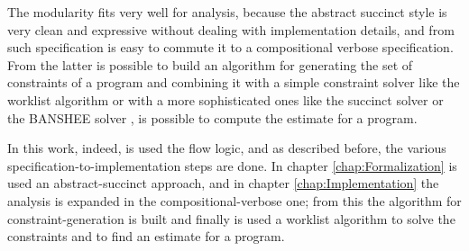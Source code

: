 
The modularity fits very well for analysis, because the abstract succinct style is very clean and expressive without dealing with implementation details, and from such specification is easy to commute it to a compositional verbose specification. From the latter is possible to build an algorithm for generating the set of constraints of a program and combining it with a simple constraint solver like the worklist algorithm \cite{PrincipleProgramAnalysis} or with a more sophisticated ones like the succinct solver \cite{SuccinctSolver} or the BANSHEE solver \cite{BansheeSolver}, is possible to compute the estimate for a program. 

In this work, indeed, is used the flow logic, and as described before, the various specification-to-implementation steps are done. In chapter \ref{chap:Formalization} is used an abstract-succinct approach, and in chapter \ref{chap:Implementation} the analysis is expanded in the compositional-verbose one; from this the algorithm for constraint-generation is built and finally is used a worklist algorithm to solve the constraints and to find an estimate for a program. 